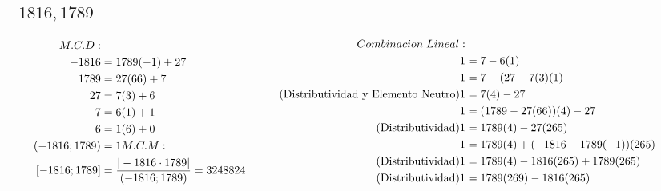 \documentclass[12pt]{article}
\begin{document}
        \subsection{$-1816,1789$}
            \begin{equation*}
                \begin{aligned}[c]
                    M.C.D: \\
                    -1816 &= 1789 (-1) + 27 \\
                    1789 &= 27(66) + 7 \\
                    27 &= 7(3) +6 \\
                    7 &= 6(1)+1 \\
                    6 &= 1(6) + 0 \\
                    (-1816;1789) &= 1
                    M.C.M: \\
                    \notag [-1816;1789] &= \frac{|-1816 \cdot 1789|}{(-1816;1789)} = 3248824
                \end{aligned}
                \begin{aligned}[c]
                Combinacion \; Lineal: \\
                    \notag 1 &= 7-6(1) \\
                    \notag 1 &= 7-(27-7(3)(1) \\
                    \tag{Distributividad y Elemento Neutro} 1 &= 7(4)-27 \\
                    \notag 1 &= (1789-27(66))(4)-27 \\
                    \tag{Distributividad} 1 &= 1789(4)-27(265) \\
                    \notag 1 &= 1789(4)+(-1816-1789(-1))(265) \\
                    \tag{Distributividad} 1 &= 1789(4)-1816(265)+1789(265) \\
                    \tag{Distributividad} 1 &= 1789(269) - 1816(265) \\
                \end{aligned}
            \end{equation*}
\end{document}
